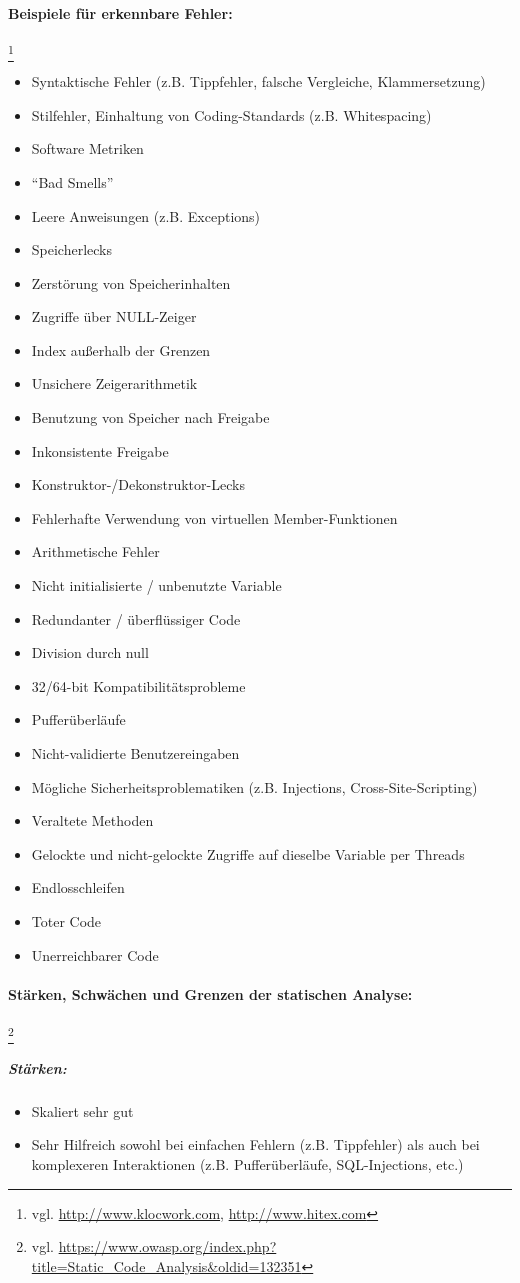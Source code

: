 \paragraph{Beispiele für erkennbare Fehler:}\footnote{vgl. \url{http://www.klocwork.com}, \url{http://www.hitex.com}}
\begin{itemize}
\item Syntaktische Fehler (z.B. Tippfehler, falsche Vergleiche, Klammersetzung)
\item Stilfehler, Einhaltung von Coding-Standards (z.B. Whitespacing)
\item Software Metriken
\item ``Bad Smells''
\item Leere Anweisungen (z.B. Exceptions)
\item Speicherlecks
\item Zerstörung von Speicherinhalten
\item Zugriffe über NULL-Zeiger
\item Index außerhalb der Grenzen
\item Unsichere Zeigerarithmetik
\item Benutzung von Speicher nach Freigabe
\item Inkonsistente Freigabe
\item Konstruktor-/Dekonstruktor-Lecks
\item Fehlerhafte Verwendung von virtuellen Member-Funktionen
\item Arithmetische Fehler
\item Nicht initialisierte / unbenutzte Variable
\item Redundanter / überflüssiger Code
\item Division durch null
\item 32/64-bit Kompatibilitätsprobleme
\item Pufferüberläufe
\item Nicht-validierte Benutzereingaben
\item Mögliche Sicherheitsproblematiken (z.B. Injections, Cross-Site-Scripting)
\item Veraltete Methoden
\item Gelockte und nicht-gelockte Zugriffe auf dieselbe Variable per Threads
\item Endlosschleifen
\item Toter Code
\item Unerreichbarer Code
\end{itemize}

\paragraph{Stärken, Schwächen und Grenzen der statischen Analyse:}\footnote{vgl. \url{https://www.owasp.org/index.php?title=Static_Code_Analysis\&oldid=132351}}
\subparagraph{Stärken:}
\begin{itemize}
\item Skaliert sehr gut
\item Sehr Hilfreich sowohl bei einfachen Fehlern (z.B. Tippfehler) als auch bei komplexeren Interaktionen (z.B. Pufferüberläufe, SQL-Injections, etc.)
\end{itemize}

